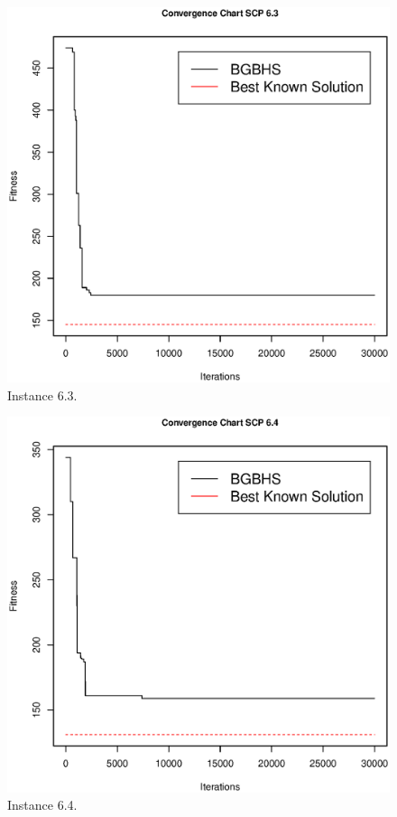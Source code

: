 \begin{figure}[]
\centering
\includegraphics[scale=.45]{Resultados/scp63.eps}
\caption{Instance 6.3.}
\label{fig:Instance.6.3}
\end{figure}

\begin{figure}[]
\centering
\includegraphics[scale=.45]{Resultados/scp64.eps}
\caption{Instance 6.4.}
\label{fig:Instance.6.4}
\end{figure}


